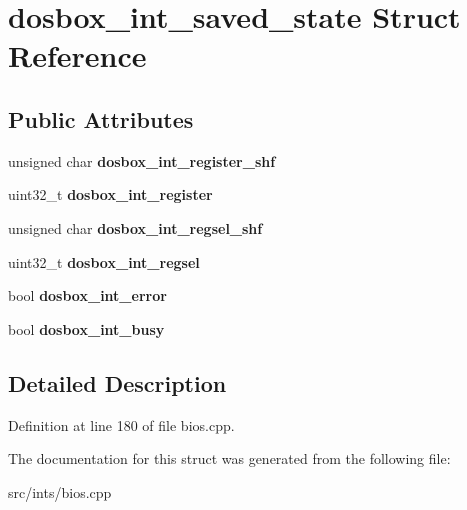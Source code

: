 \hypertarget{structdosbox__int__saved__state}{\section{dosbox\-\_\-int\-\_\-saved\-\_\-state Struct Reference}
\label{structdosbox__int__saved__state}
}
\subsection*{Public Attributes}
\begin{DoxyCompactItemize}
\item 
\hypertarget{structdosbox__int__saved__state_a3190dad41dc7ebdb7a5e478c37fba33e}{unsigned char {\bfseries dosbox\-\_\-int\-\_\-register\-\_\-shf}}\label{structdosbox__int__saved__state_a3190dad41dc7ebdb7a5e478c37fba33e}

\item 
\hypertarget{structdosbox__int__saved__state_a4cf4d84310e8ea530f67d12b6dd47aca}{uint32\-\_\-t {\bfseries dosbox\-\_\-int\-\_\-register}}\label{structdosbox__int__saved__state_a4cf4d84310e8ea530f67d12b6dd47aca}

\item 
\hypertarget{structdosbox__int__saved__state_a8baf767617af9ec07f8179944c14d327}{unsigned char {\bfseries dosbox\-\_\-int\-\_\-regsel\-\_\-shf}}\label{structdosbox__int__saved__state_a8baf767617af9ec07f8179944c14d327}

\item 
\hypertarget{structdosbox__int__saved__state_a22e6fa7e3be634cbbc53513c894a9612}{uint32\-\_\-t {\bfseries dosbox\-\_\-int\-\_\-regsel}}\label{structdosbox__int__saved__state_a22e6fa7e3be634cbbc53513c894a9612}

\item 
\hypertarget{structdosbox__int__saved__state_ad5b90f6e340dc6be7d0f6c1cd9c24056}{bool {\bfseries dosbox\-\_\-int\-\_\-error}}\label{structdosbox__int__saved__state_ad5b90f6e340dc6be7d0f6c1cd9c24056}

\item 
\hypertarget{structdosbox__int__saved__state_a61744b295bdc81881e4d05f2bd22f194}{bool {\bfseries dosbox\-\_\-int\-\_\-busy}}\label{structdosbox__int__saved__state_a61744b295bdc81881e4d05f2bd22f194}

\end{DoxyCompactItemize}


\subsection{Detailed Description}


Definition at line 180 of file bios.\-cpp.



The documentation for this struct was generated from the following file\-:\begin{DoxyCompactItemize}
\item 
src/ints/bios.\-cpp\end{DoxyCompactItemize}
